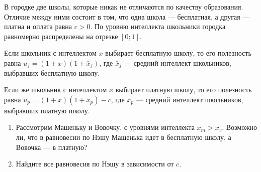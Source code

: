 \begin{problem}
В городке две школы, которые никак не отличаются по качеству образования. Отличие между ними состоит в том, что одна школа — бесплатная, а другая — платна и оплата равна $c>0$. По уровню интеллекта школьники городка равномерно распределены на отрезке $[0;1]$. \par
Если школьник с интеллектом $x$ выбирает бесплатную школу, то его полезность равна $u_{f}=(1+x)(1+\bar{x}_{f})$, где $\bar{x}_{f}$ — средний интеллект школьников, выбравших бесплатную школу. \par
Если же школьник с интеллектом $x$ выбирает платную школу, то его полезность равна $u_{p}=(1+x)(1+\bar{x}_{p})-c$, где $\bar{x}_{p}$ — средний интеллект школьников, выбравших платную школу. \par
\begin{enumerate}
\item Рассмотрим Машеньку и Вовочку, с уровнями интеллекта $x_{m}>x_{v}$. Возможно ли, что в равновесии по Нэшу Машенька идет в бесплатную школу, а Вовочка — в платную? \par
\item Найдите все равновесия по Нэшу в зависимости от $c$.
\end{enumerate}



\end{problem}
